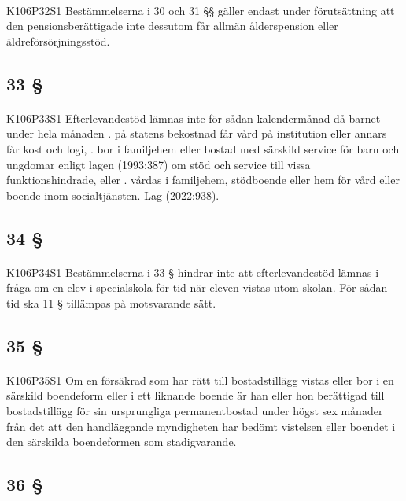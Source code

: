 \documentclass[a4paper,notitlepage,openany,10pt]{book}
\begin{document}
\paragraph*{}
{\tiny K106P32S1}
Bestämmelserna i 30 och 31 §§ gäller endast under förutsättning att den pensionsberättigade inte dessutom får allmän ålderspension eller äldreförsörjningsstöd.
\subsection*{33 §}
\paragraph*{}
{\tiny K106P33S1}
Efterlevandestöd lämnas inte för sådan kalendermånad då barnet under hela månaden
. på statens bekostnad får vård på institution eller annars får kost och logi,
. bor i familjehem eller bostad med särskild service för barn och ungdomar enligt lagen (1993:387) om stöd och service till vissa funktionshindrade, eller
. vårdas i familjehem, stödboende eller hem för vård eller boende inom socialtjänsten.
Lag (2022:938).
\subsection*{34 §}
\paragraph*{}
{\tiny K106P34S1}
Bestämmelserna i 33 § hindrar inte att efterlevandestöd lämnas i fråga om en elev i specialskola för tid när eleven vistas utom skolan. För sådan tid ska 11 § tillämpas på motsvarande sätt.
\subsection*{35 §}
\paragraph*{}
{\tiny K106P35S1}
Om en försäkrad som har rätt till bostadstillägg vistas eller bor i en särskild boendeform eller i ett liknande boende är han eller hon berättigad till bostadstillägg för sin ursprungliga permanentbostad under högst sex månader från det att den handläggande myndigheten har bedömt vistelsen eller boendet i den särskilda boendeformen som stadigvarande.
\subsection*{36 §}
\end{document}
